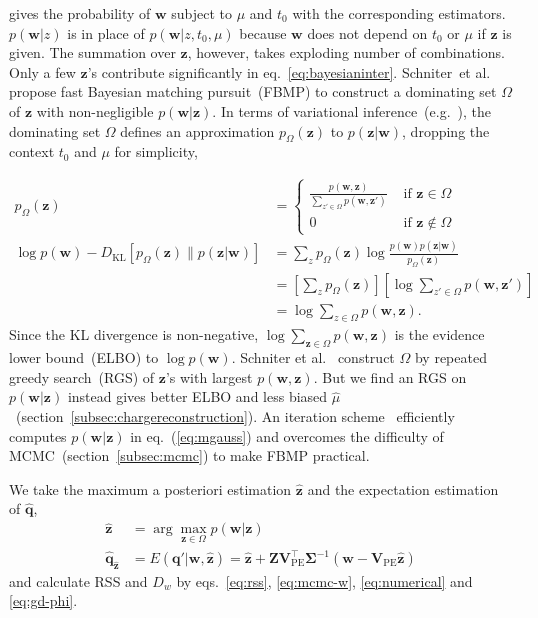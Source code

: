 gives the probability of $\bm{w}$ subject to $\mu$ and $t_0$ with the corresponding estimators. $p(\bm{w}|z)$ is in place of $p(\bm{w}|z, t_0, \mu)$ because $\bm{w}$ does not depend on $t_0$ or $\mu$ if $\bm{z}$ is given.  The summation over $\bm{z}$, however, takes exploding number of combinations. Only a few $\bm{z}$'s contribute significantly in eq.~\eqref{eq:bayesianinter}.  Schniter~et al.~\cite{schniter_fast_2008} propose fast Bayesian matching pursuit~(FBMP) to construct a dominating set $\Omega$ of $\bm{z}$ with non-negligible $p(\bm{w}|\bm{z})$.  In terms of variational inference~(e.g.~\cite{mackay_information_2003}), the dominating set $\Omega$ defines an approximation $p_\Omega(\bm{z})$ to $p(\bm{z}|\bm{w})$, dropping the context $t_0$ and $\mu$ for simplicity,

\begin{equation}
  \label{eq:VI}
  \begin{aligned}
    p_\Omega(\bm{z}) &= \begin{cases}
      \frac{p(\bm{w},\bm{z})}{\sum_{z' \in \Omega} p(\bm{w},\bm{z}')} & \text{ if } \bm{z} \in \Omega \\ 
      0 & \text{ if } \bm{z} \notin \Omega
    \end{cases}\\
    \log p(\bm{w}) - D_\mathrm{KL}\left[p_\Omega(\bm{z}) \parallel p(\bm{z}|\bm{w})\right] &= \sum_z p_\Omega(\bm{z}) \log \frac{p(\bm{w}) p(\bm{z}|\bm{w})}{p_\Omega(\bm{z})} \\
    &= \left[\sum_z p_\Omega(\bm{z})\right]\left[\log \sum_{z' \in \Omega} p(\bm{w}, \bm{z'}) \right] \\
    &= \log \sum_{z \in \Omega} p(\bm{w}, \bm{z}).
  \end{aligned}
\end{equation}
Since the KL divergence is non-negative, $\log \sum_{\bm{z} \in \Omega} p(\bm{w}, \bm{z})$ is the evidence lower bound~(ELBO) to $\log p(\bm{w})$.  Schniter et al.~\cite{schniter_fast_2008} construct $\Omega$ by repeated greedy search~(RGS) of $\bm{z}$'s with largest $p(\bm{w}, \bm{z})$.  But we find an RGS on $p(\bm{w}|\bm{z})$ instead gives better ELBO and less biased $\hat{\mu}$~(section~\ref{subsec:chargereconstruction}).  An iteration scheme~\cite{schniter_fast_2008} efficiently computes $p(\bm{w}|\bm{z})$ in eq.~(\ref{eq:mgauss}) and overcomes the difficulty of MCMC~(section~\ref{subsec:mcmc}) to make FBMP practical.

We take the maximum a posteriori estimation $\hat{\bm{z}}$ and the expectation estimation of $\hat{\bm{q}}$,
\begin{equation}
  \label{eq:fbmpcharge}
  \begin{aligned}
    \hat{\bm{z}} &= \arg \underset{\bm{z} \in \Omega}{\max} p(\bm{w}|\bm{z}) \\
    \hat{\bm{q}}_{\hat{\bm{z}}} &= E(\bm{q}'|\bm{w},\hat{\bm{z}}) = \hat{\bm{z}} + \bm{Z}\bm{V}_\mathrm{PE}^\intercal\bm{\Sigma}^{-1}(\bm{w}-\bm{V}_\mathrm{PE}\hat{\bm{z}})
  \end{aligned}
\end{equation}
and calculate RSS and $D_w$ by eqs.~\eqref{eq:rss}, \eqref{eq:mcmc-w}, \eqref{eq:numerical} and \eqref{eq:gd-phi}.

